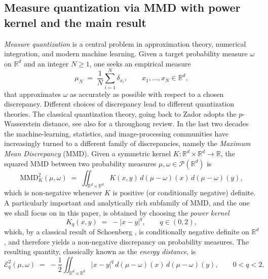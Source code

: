 \documentclass[12pt,a4paper,oneside]{amsart}
\theoremstyle{plain}
\theoremstyle{definition}
\numberwithin{equation}{section}
\numberwithin{figure}{section}
\numberwithin{table}{section}
\theoremstyle{remark}
\newcommand{\R}{\mathbb{R}}
\begin{document}
\subsection{Measure quantization via MMD with power kernel and the main result}\label{sec:intro_MMD}

\emph{Measure quantization} is a central problem in approximation theory, numerical integration, and modern machine learning. Given a target probability measure $\omega$ on $\R^d$ and an integer $N\geq 1$, one seeks an empirical measure
\begin{equation*}
    \mu_N \;=\; \frac{1}{N}\sum_{i=1}^N \delta_{x_i}, \qquad x_1,\dots,x_N\in\R^d,
\end{equation*}
that approximates $\omega$ as accurately as possible with respect to a chosen discrepancy. Different choices of discrepancy lead to different quantization theories. The classical quantization theory, going back to Zador \cite{zador1966topics} adopts the $p$-Wasserstein distance, see also \cite{GrafLuschgy} for a throughoug review. In the last two decades the machine-learning, statistics, and image-processing communities \cite{gretton2006kernel, sejdinovic2013equivalence, schmaltz2010electrostatic} have increasingly turned to a different family of discrepancies, namely the \emph{Maximum Mean Discrepancy} (MMD). Given a symmetric kernel $K:\R^d\times\R^d\to\R$, the squared MMD between two probability measures $\mu,\omega\in\mathcal P(\R^d)$ is
\begin{equation}\label{eq:mmd-intro}
    \mathrm{MMD}_K^2(\mu,\omega)
    \;=\;
    \iint_{\R^d\times\R^d} K(x,y)\,d(\mu-\omega)(x)\,d(\mu-\omega)(y),
\end{equation}
which is non-negative whenever $K$ is positive (or conditionally negative) definite. A particularly important and analytically rich subfamily of MMD, and the one we shall focus on in this paper, is obtained by choosing the \emph{power kernel}
\begin{equation*}
    K_q(x,y) \;=\; -|x-y|^q,\qquad q\in(0,2),
\end{equation*}
which, by a classical result of Schoenberg \cite{schoenberg1938monotone,schoenberg1938positive}, is conditionally negative definite on $\R^d$, and therefore yields a non-negative discrepancy on probability measures. The resulting quantity, classically known as the \emph{energy distance}, is
\begin{equation}\label{eq1}
  \mathcal{E}_q^2(\mu,\omega)
  \;=\;
  -\frac{1}{2}
  \iint_{\R^d\times\R^d}
  |x-y|^q\,d(\mu-\omega)(x)\,d(\mu-\omega)(y),
  \qquad 0 < q < 2,
\end{equation}
\end{document}
